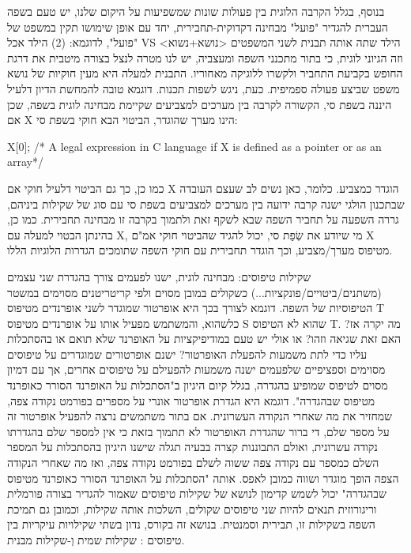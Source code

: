       בנוסף, בגלל הקרבה הלוגית בין פעולות שונות שמשפיעות על היקום שלנו, יש טעם בשפה
      העברית להגדיר "פועל" מבחינה דקדוקית-תחבירית, יחד עם אופן שימושו תקין במשפט של
      "פועל", לדוגמא: (2) הילד אכל VS הילד שתה
      אותה תבנית לשני המשפטים <נושא+נשוא> וזה הגיוני לוגית, כי בתור מתכנני השפה ומעצביה, יש לנו מטרה לנצל בצורה מיטבית את דרגת החופש בקביעת התחביר ולקשרו ללוגיקה מאחוריו. התבנית למעלה היא מעין חוקיות של נושא משפט שביצע פעולה ספמיפית.
      כעת, ניגש לשפות תכנות.
      דוגמא טובה להמחשת הדיון דלעיל היננה בשפת סי, הקשורה לקרבה בין מערכים למצביעים שקיימת מבחינה לוגית בשפה, שכן אם X הינו מערך שהוגדר, הביטוי הבא חוקי בשפת סי:

\begin{CPP}
X[0]; /* A legal expression in C language if X is defined as a pointer or as an array*/
\end{CPP}

      כמו כן, כך גם הביטוי דלעיל חוקי אם X הוגדר כמצביע. כלומר, כאן נשים לב שעצם
      העובדה שבתכנון הולגי ישנה קרבה ידועה בין מערכים למצביעים בשפת סי עם סוג של
      שקילות ביניהם, גררה השפעה על תחביר השפה שבא לשקף זאת ולתמוך בקרבה זו מבחינה
      תחבירית. כמו כן, בהינתן הבטוי למעלה עם X, מי שיודע את שְׂפַת סי, יכול להגיד
      שהביטוי חוקי אמ"ם X מטיפוס מערך/מצביע, וכך הוגדר תחבירית עם חוקי השפה שתומכים
      הגדרות הלוגיות הללו.

      שקילות טיפוסים:
      מבחינה לוגית, ישנו לפעמים צורך בהגדרת שני עצמים (משתנים/ביטויים/פונקציות...)
      כשקולים במובן מסוים ולפי קריטריטנים מסוימים במשטר הטיפוסיות של השפה. דוגמא
      לצורך בכך היא אופרטור שמוגדר לשני אופרנדים מטיפוס T כלשהוא, והמשתמש מפעיל אותו
      על אופרנדים מטיפוס S שהוא לא הטיפוס T. מה יקרה אז? האם זאת שגיאה וזהו? או אולי
      יש טעם במודיפיקציות על האופרנד שלא תואם או בהסתכלות עליו כדי לתת משמעות להפעלת
      האופרטור? ישנם אופרטורים שמוגדרים על טיפוסים מסוימים וספציפיים שלפעמים ישנה
      משמעות להפעילם על טיפוסים אחרים, אך עם דמיון מסוים לטיפוס שמופיע בהגדרה, בגלל
      קיום היגיון ב"הסתכלות על האופרנד הסורר כאופרנד מטיפוס שבהגדרה". דוגמא היא הגדרת
      אופרטור אונרי על מספרים בפורמט נקודה צפה, שמחזיר את מה שאחרי הנקודה העשרונית.
      אם בתור משתמשים נרצה להפעיל אופרטור זה על מספר שלם, די ברור שהגדרת האופרטור לא
      תתמוך בזאת כי אין למספר שלם בהגדרתו נקודה עשרונית, ואולם התבוננות קצרה בבעיה
      תגלה שישנו היגיון בהסתכלות על המספר השלם כמספר עם נקודה צפה ששוה לשלם בפורמט
      נקודה צפה, ואז מה שאחרי הנקודה הצפה הופך מוגדר ושווה כמובן לאפס. אותה "הסתכלות
      על האופרנד הסורר כאופרנד מטיפוס שבהגדרה" יכול לשמש קדימון לנושא של שקילות
      טיפוסים שאמור להגדיר בצורה פורמלית וריגורוזית תנאים להיות שני טיפוסים שקולים,
      השלכות אותה שקילות, וכמובן גם תמיכת השפה בשקילות זו, תבירית וסמנטית. בנושא זה
      בקורס, נדון בשתי שקילויות עיקריות בין טיפוסים : שקילות שמית וְ-שקילות מבנית.

